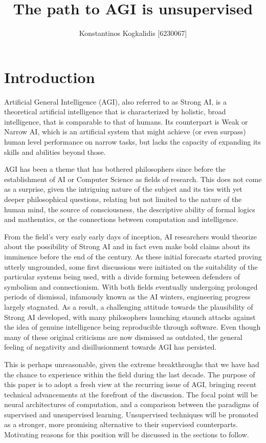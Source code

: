 \documentclass[]{article}
\begin{document}
\author{Konstantinos Kogkalidis [6230067]}
\title{The path to AGI is unsupervised}
\maketitle

\section{Introduction}
Artificial General Intelligence (AGI), also referred to as Strong AI, is a theoretical artificial intelligence that is characterized by holistic, broad intelligence, that is comparable to that of humans. Its counterpart is Weak or Narrow AI, which is an artificial system that might achieve (or even surpass) human level performance on narrow tasks, but lacks the capacity of expanding its skills and abilities beyond those.

AGI has been a theme that has bothered philosophers since before the establishment of AI or Computer Science as fields of research. This does not come as a surprise, given the intriguing nature of the subject and its ties with yet deeper philosophical questions, relating but not limited to the nature of the human mind, the source of consciousness, the descriptive ability of formal logics and mathemtics, or the connections between computation and intelligence. 

From the field's very early early days of inception, AI researchers would theorize about the possibility of Strong AI and in fact even make bold claims about its imminence before the end of the century. As these initial forecasts started proving utterly ungrounded, some first discussions were initiated on the suitability of the particular systems being used, with a divide forming beteween defenders of symbolism and connectionism. With both fields eventually undergoing prolonged periods of dismissal, infamously known as the AI winters, engineering progress largely stagnated. As a result, a challenging attitude towards the plausibility of Strong AI developed, with many philosophers launching staunch attacks against the idea of genuine intelligence being reproducible through software. Even though many of these original criticisms are now dismissed as outdated, the general feeling of negativity and disillusionment towards AGI has persisted. 

This is perhaps unreasonable, given the extreme breakthroughs that we have had the chance to experience within the field during the last decade. The purpose of this paper is to adopt a fresh view at the recurring issue of AGI, bringing recent technical advancements at the forefront of the discussion. The focal point will be neural architectures of computation, and a comparison between the paradigms of supervised and unsupervised learning. Unsupervised techniques will be promoted as a stronger, more promising alternative to their supervised counterparts. Motivating reasons for this position will be discussed in the sections to follow.
\end{document}
